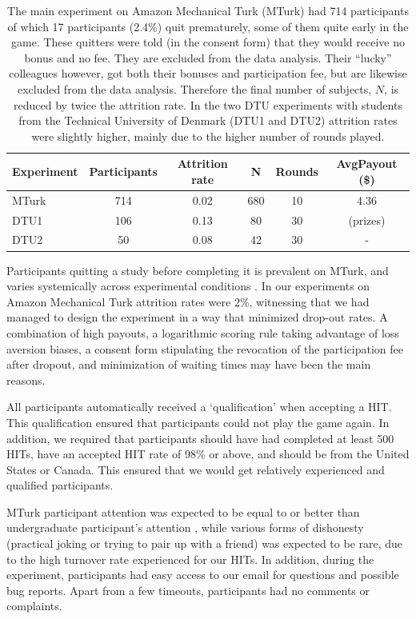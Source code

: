 \begin{table} %
\centering
\begin{tabular}{lccccc}
\hline
Experiment   &   Participants &   Attrition rate &   N & Rounds & AvgPayout  (\$) \\
\hline
 MTurk 	& 714 &  0.02 &  680 & 10 & 4.36    \\
 DTU1  	& 106 &  0.13 &  80 & 30 & (prizes)   \\
 DTU2  	&   50 &  0.08 &  42 & 30 & - \\
\hline
\end{tabular}
\caption{The main experiment on Amazon Mechanical Turk (MTurk) had 714 participants of which 17 participants (2.4\%) quit prematurely, some of them quite early in the game. These quitters were told (in the consent form) that they would receive no bonus and no  fee. They are excluded from the data analysis. Their ``lucky'' colleagues however, got both their bonuses and participation fee, but are likewise excluded from the data analysis. Therefore the final number of subjects, $N$, is reduced by twice the attrition rate. In the two DTU experiments with students from the Technical University of Denmark (DTU1 and DTU2) attrition rates were slightly higher, mainly due to the higher number of rounds played.}
\label{table:A1}
\end{table}

Participants quitting a study before completing it is prevalent on MTurk, and varies systemically across experimental conditions \cite{ZhouFishbach16}. In our experiments on Amazon Mechanical Turk attrition rates were $2\%$, witnessing that we had managed to design the experiment in a way that minimized drop-out rates. A combination of high payouts, a logarithmic scoring rule taking advantage of loss aversion biases, a consent form stipulating the revocation of the participation fee after dropout, and minimization of waiting times may have been the main reasons.

All participants automatically received a `qualification' when accepting a HIT. This qualification ensured that participants could not play the game again. In addition, we required that participants should have had completed at least 500 HITs, have an accepted HIT rate of 98\% or above, and should be from the United States or Canada. This ensured that we would get relatively experienced and qualified participants.

MTurk participant attention was expected to be equal to or better than undergraduate participant's attention \cite{Rand2012}, while various forms of dishonesty (practical joking or trying to pair up with a friend) was expected to be rare, due to the high turnover rate experienced for our HITs. In addition, during the experiment, participants had easy access to our email for questions and possible bug reports. Apart from a few timeouts, participants had no comments or complaints.

